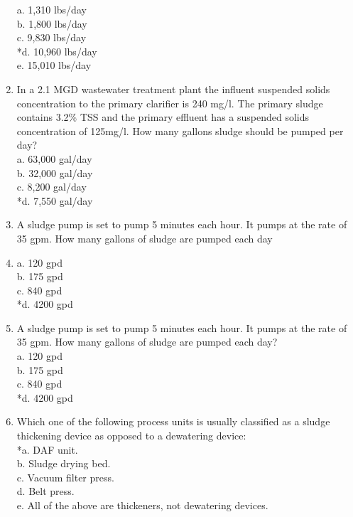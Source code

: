 \documentclass{article}
\begin{document}
\begin{enumerate}
a. 1,310 lbs/day \\
b. 1,800 lbs/day \\
c. 9,830 lbs/day \\
*d. 10,960 lbs/day \\
e. 15,010 lbs/day \\

\item  In a 2.1 MGD wastewater treatment plant the influent suspended solids concentration to the primary clarifier is 240 mg/l.  The primary sludge contains 3.2\% TSS and the primary effluent has a suspended solids concentration of 125mg/l.  How many gallons sludge should be pumped per day? \\

a. 63,000 gal/day \\
b. 32,000 gal/day \\
c. 8,200 gal/day \\
*d. 7,550 gal/day \\

\item  A sludge pump is set to pump 5 minutes each hour. It pumps at the rate of 35 gpm. How many gallons of sludge are pumped each day\\

\item  a. 120 gpd \\
b. 175 gpd \\
c. 840 gpd \\
*d. 4200 gpd \\

\item  A sludge pump is set to pump 5 minutes each hour. It pumps at the rate of 35 gpm. How many gallons of sludge are pumped each day? \\

a. 120 gpd \\
b. 175 gpd \\
c. 840 gpd \\
*d. 4200 gpd \\

\item  Which one of the following process units is usually classified as a sludge thickening device as opposed to a dewatering device: \\

*a. DAF unit. \\
b. Sludge drying bed. \\
c. Vacuum filter press. \\
d. Belt press. \\
e. All of the above are thickeners, not dewatering devices. \\


\end{enumerate}
\end{document}
